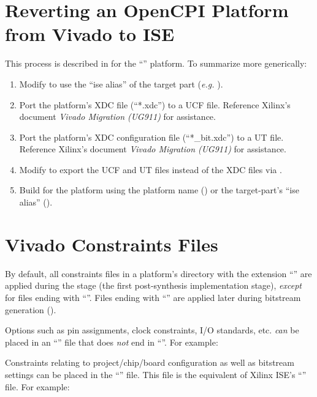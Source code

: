 \begin{flushleft}
\section{Reverting an OpenCPI Platform from Vivado to ISE}
This process is described in  for the ``'' platform. To summarize more generically:
\begin{enumerate}
\item Modify  to use the ``ise alias'' of the target part (\textit{e.g.} ).
\item{Port the platform's XDC file (``*.xdc'') to a UCF file. Reference Xilinx's document \textit{Vivado Migration (UG911)} for assistance}.
\item{Port the platform's XDC configuration file (``*\_bit.xdc'') to a UT file. Reference Xilinx's document \textit{Vivado Migration (UG911)} for assistance}.
\item Modify  to export the UCF and UT files instead of the XDC files via .
\item Build for the platform using the platform name () or the target-part's ``ise alias'' ().
\end{enumerate}

\section{Vivado Constraints Files}
By default, all constraints files in a platform's directory with the extension ``'' are applied during the  stage (the first post-synthesis implementation stage), \textit{except} for files ending with ``''. Files ending with ``'' are applied later during bitstream generation ().\newline

Options such as pin assignments, clock constraints, I/O standards, etc. \textit{can} be placed in an ``'' file that does \textit{not} end in ``''. For example:\newline
{}\newline

Constraints relating to project/chip/board configuration as well as bitstream settings can be placed in the ``'' file. This file is the equivalent of Xilinx ISE's ``'' file. For example:\newline
{}



\end{flushleft}
